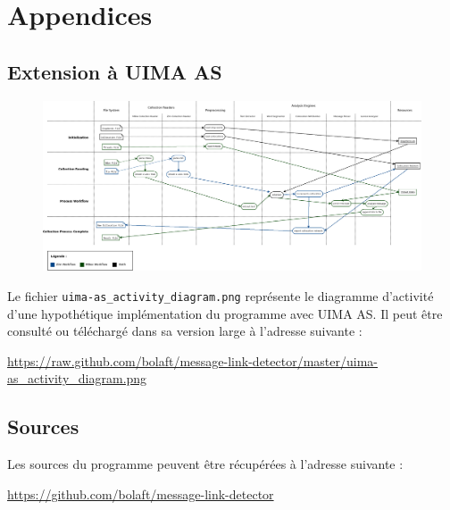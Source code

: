 \documentclass[a4paper]{article}
\begin{document}
\section{Appendices}

\subsection{Extension à UIMA AS}

\begin{figure}[H]
\centering
\includegraphics[width=\textwidth]{./uima-as_activity_diagram.png}
\label{overflow}
\end{figure}

Le fichier \texttt{uima-as\_activity\_diagram.png} représente le diagramme d'activité d'une hypothétique implémentation du programme avec UIMA AS. Il peut être consulté ou téléchargé dans sa version large à l'adresse suivante :\newline

\url{https://raw.github.com/bolaft/message-link-detector/master/uima-as_activity_diagram.png}

\subsection{Sources}

Les sources du programme peuvent être récupérées à l'adresse suivante :\newline

\url{https://github.com/bolaft/message-link-detector}
\end{document}
